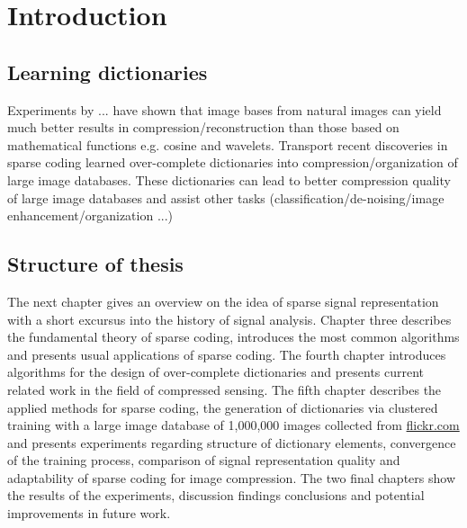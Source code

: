 \chapter{Introduction}
\label{sec:introduction}
\section{Learning dictionaries} %



Experiments by ... have shown that image bases from natural
images can yield much better results in compression/reconstruction than
those based on mathematical functions e.g. cosine and
wavelets.\cite{Elad2006,Mairal2010}
Transport recent discoveries in sparse coding learned over-complete
dictionaries into compression/organization of large image databases.
These dictionaries can lead to better compression quality of large
image databases and assist other tasks (classification/de-noising/image
enhancement/organization ...)


\section{Structure of thesis}
The next chapter gives an overview on the idea of sparse signal
representation with a short excursus into the history of signal analysis.
Chapter 
three describes the fundamental theory of sparse coding, introduces the most
common algorithms and presents usual applications of sparse coding. The fourth
chapter introduces algorithms for the design of over-complete dictionaries and
presents current related work in the field of compressed sensing. The fifth
chapter describes the applied methods for sparse coding, the generation of
dictionaries via clustered training with a large image database of 1,000,000
images collected from \url{flickr.com} and presents experiments regarding
structure of dictionary elements, convergence of the training process,
comparison of signal representation quality and adaptability of sparse coding
for image compression. The two final chapters show the results of the
experiments, discussion findings conclusions and potential improvements in
future work. 

